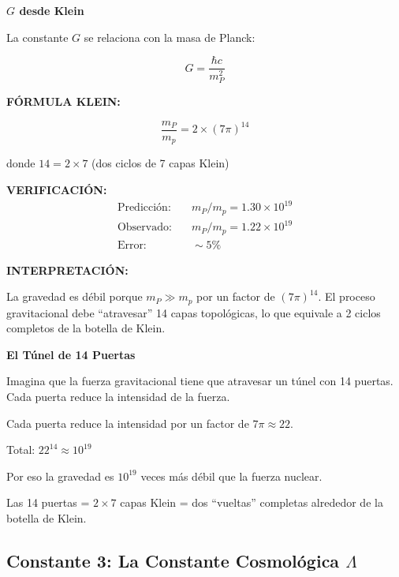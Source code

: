 \begin{nivelmatematico}
\textbf{$G$ desde Klein}

La constante $G$ se relaciona con la masa de Planck:

\begin{equation}
G = \frac{\hbar c}{m_P^2}
\end{equation}

\textbf{FÓRMULA KLEIN:}

\begin{equation}
\boxed{\frac{m_P}{m_p} = 2 \times (7\pi)^{14}}
\end{equation}

donde $14 = 2 \times 7$ (dos ciclos de 7 capas Klein)

\textbf{VERIFICACIÓN:}
\begin{align}
\text{Predicción:} & \quad m_P/m_p = 1.30 \times 10^{19}\\
\text{Observado:} & \quad m_P/m_p = 1.22 \times 10^{19}\\
\text{Error:} & \quad \sim 5\%
\end{align}

\textbf{INTERPRETACIÓN:}

La gravedad es débil porque $m_P \gg m_p$ por un factor de $(7\pi)^{14}$.
El proceso gravitacional debe ``atravesar'' 14 capas topológicas,
lo que equivale a 2 ciclos completos de la botella de Klein.
\end{nivelmatematico}

\begin{analogiabox}
\textbf{El Túnel de 14 Puertas}

Imagina que la fuerza gravitacional tiene que atravesar un túnel
con 14 puertas. Cada puerta reduce la intensidad de la fuerza.

Cada puerta reduce la intensidad por un factor de $7\pi \approx 22$.

Total: $22^{14} \approx 10^{19}$

Por eso la gravedad es $10^{19}$ veces más débil que la fuerza nuclear.

Las 14 puertas = $2 \times 7$ capas Klein = dos ``vueltas'' completas
alrededor de la botella de Klein.
\end{analogiabox}


\subsection{Constante 3: La Constante Cosmológica $\Lambda$}

